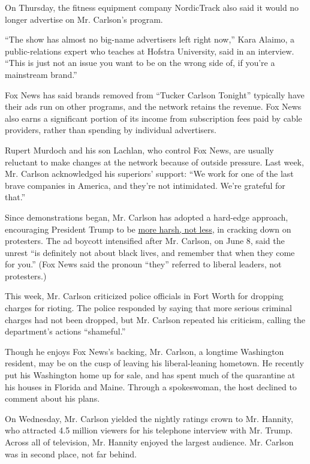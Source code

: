 On Thursday, the fitness equipment company NordicTrack also said it
would no longer advertise on Mr. Carlson's program.

``The show has almost no big-name advertisers left right now,'' Kara
Alaimo, a public-relations expert who teaches at Hofstra University,
said in an interview. ``This is just not an issue you want to be on the
wrong side of, if you're a mainstream brand.''

Fox News has said brands removed from ``Tucker Carlson Tonight''
typically have their ads run on other programs, and the network retains
the revenue. Fox News also earns a significant portion of its income
from subscription fees paid by cable providers, rather than spending by
individual advertisers.

Rupert Murdoch and his son Lachlan, who control Fox News, are usually
reluctant to make changes at the network because of outside pressure.
Last week, Mr. Carlson acknowledged his superiors' support: ``We work
for one of the last brave companies in America, and they're not
intimidated. We're grateful for that.''

Since demonstrations began, Mr. Carlson has adopted a hard-edge
approach, encouraging President Trump to be
\href{https://www.nytimes.com/2020/06/01/business/media/unrest-trump-tucker-carlson-anderson-cooper.html}{more
harsh, not less}, in cracking down on protesters. The ad boycott
intensified after Mr. Carlson, on June 8, said the unrest ``is
definitely not about black lives, and remember that when they come for
you.'' (Fox News said the pronoun ``they'' referred to liberal leaders,
not protesters.)

This week, Mr. Carlson criticized police officials in Fort Worth for
dropping charges for rioting. The police responded by saying that more
serious criminal charges had not been dropped, but Mr. Carlson repeated
his criticism, calling the department's actions ``shameful.''

Though he enjoys Fox News's backing, Mr. Carlson, a longtime Washington
resident, may be on the cusp of leaving his liberal-leaning hometown. He
recently put his Washington home up for sale, and has spent much of the
quarantine at his houses in Florida and Maine. Through a spokeswoman,
the host declined to comment about his plans.

On Wednesday, Mr. Carlson yielded the nightly ratings crown to Mr.
Hannity, who attracted 4.5 million viewers for his telephone interview
with Mr. Trump. Across all of television, Mr. Hannity enjoyed the
largest audience. Mr. Carlson was in second place, not far behind.

